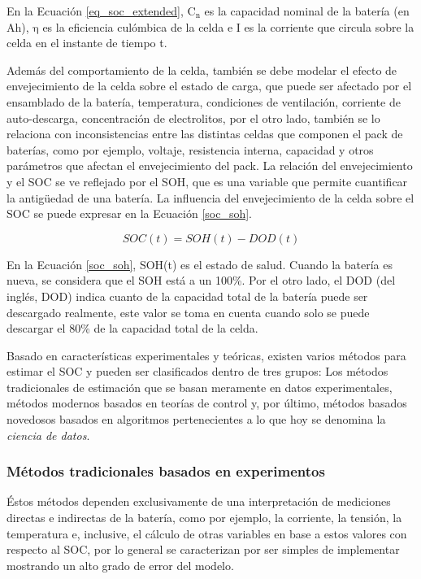 \documentclass[10pt,a4paper]{article}
\begin{document}
\noindent En la Ecuaci\'on \ref{eq_soc_extended}, $\mathrm{C_n}$ es la 
capacidad nominal de la bater\'ia (en Ah), $\mathrm{\eta}$ es la eficiencia 
cul\'ombica de la celda e I es la corriente que circula sobre la celda en el 
instante de tiempo t.

\noindent Adem\'as del comportamiento de la celda, tambi\'en se debe modelar el
efecto de envejecimiento de la celda sobre el estado de carga, que puede ser
afectado por el ensamblado de la bater\'ia, temperatura, condiciones de
ventilaci\'on, corriente de auto-descarga, concentraci\'on de electrolitos, por
el otro lado, tambi\'en se lo relaciona con inconsistencias entre las distintas
celdas que componen el pack de bater\'ias, como por ejemplo, voltaje,
resistencia interna, capacidad y otros par\'ametros que afectan el 
envejecimiento del pack. La relaci\'on del envejecimiento y el \acrshort{SOC} se
ve reflejado por el \acrshort{SOH}, que es una variable que permite cuantificar
la antigüedad de una bater\'ia. La influencia del envejecimiento de la celda
sobre el \acrshort{SOC} se puede expresar en la Ecuaci\'on \ref{soc_soh}.

\begin{equation}
    SOC(t) = SOH(t) - DOD(t) \label{soc_soh}
\end{equation}

\noindent En la Ecuaci\'on \ref{soc_soh}, SOH(t) es el estado de salud. 
Cuando la bater\'ia es nueva, se considera que el SOH est\'a a un 100\%. 
Por el otro lado, el \acrshort{DOD} (del ingl\'es, \acrlong{DOD}) indica cuanto 
de la capacidad total de la bater\'ia puede ser descargado realmente, este valor 
se toma en cuenta cuando solo se puede descargar el 80\% de la capacidad total 
de la celda.

\noindent Basado en caracter\'isticas experimentales y te\'oricas, existen 
varios m\'etodos para estimar el \acrshort{SOC} y pueden ser clasificados dentro 
de tres grupos: Los m\'etodos tradicionales de estimaci\'on que se basan 
meramente en datos experimentales, m\'etodos modernos basados en teor\'ias de 
control y, por \'ultimo, m\'etodos basados novedosos basados en algoritmos
pertenecientes a lo que hoy se denomina la \emph{ciencia de datos}.

\subsubsection{M\'etodos tradicionales basados en experimentos}
\label{tradSocMeth}

\'Estos m\'etodos dependen exclusivamente de una interpretaci\'on de mediciones
directas e indirectas de la bater\'ia, como por ejemplo, la corriente, 
la tensi\'on, la temperatura e, inclusive, el c\'alculo de otras variables en
base a estos valores con respecto al \acrshort{SOC}, por lo general se
caracterizan por ser simples de implementar mostrando un alto grado de error del
modelo. 
\end{document}
